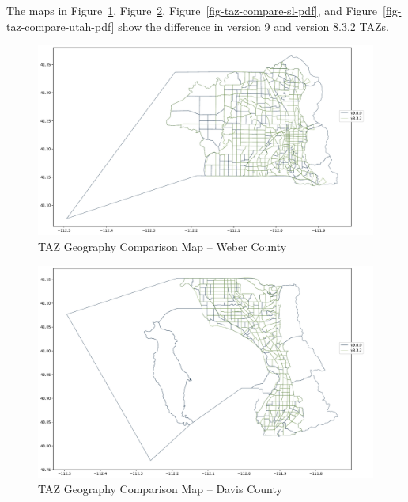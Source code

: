 \documentclass[
  letterpaper,
  DIV=11,
  numbers=noendperiod]{scrreprt}
\begin{document}
The maps in Figure~\ref{fig-taz-compare-weber-pdf},
Figure~\ref{fig-taz-compare-davis-pdf},
Figure~\ref{fig-taz-compare-sl-pdf}, and
Figure~\ref{fig-taz-compare-utah-pdf} show the difference in version 9
and version 8.3.2 TAZs.

\begin{figure}[H]

{\centering \includegraphics{v9x/v900/whats-new/2-inputdata_files/figure-pdf/fig-taz-compare-weber-pdf-output-1.pdf}

}

\caption{\label{fig-taz-compare-weber-pdf}TAZ Geography Comparison Map
-- Weber County}

\end{figure}

\begin{figure}[H]

{\centering \includegraphics{v9x/v900/whats-new/2-inputdata_files/figure-pdf/fig-taz-compare-davis-pdf-output-1.pdf}

}

\caption{\label{fig-taz-compare-davis-pdf}TAZ Geography Comparison Map
-- Davis County}

\end{figure}
\end{document}

